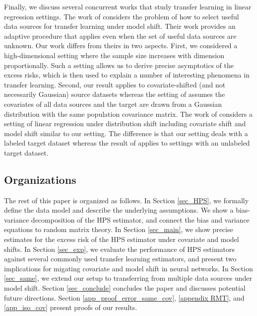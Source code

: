 Finally, we discuss several concurrent works that study transfer learning in linear regression settings.
The work of \citet{li2020transfer} considers the problem of how to select useful data sources for transfer learning under model shift.
Their work provides an adaptive procedure that applies even when the set of useful data sources are unknown.
Our work differs from theirs in two aspects.
First, we considered a high-dimensional setting where the sample size increases with dimension proportionally.
Such a setting allows us to derive precise asymptotics of the excess risks, which is then used to explain a number of interesting phenomena in transfer learning.
Second, our result applies to covariate-shifted (and not necessarily Gaussian) source datasets whereas the setting of \citet{li2020transfer} assumes the covariates of all data sources and the target are drawn from a Gaussian distribution with the same population covariance matrix.
The work of \citet{lei2021nearoptimal} considers a setting of linear regression under distribution shift including covariate shift and model shift similar to our setting.
The difference is that our setting deals with a labeled target dataset whereas the result of \citet{lei2021nearoptimal} applies to settings with an unlabeled target dataset.





\subsection{Organizations}
The rest of this paper is organized as follows.
In Section \ref{sec_HPS}, we formally define the data model and describe the underlying assumptions.
We show a bias-variance decomposition of the HPS estimator, and connect the bias and variance equations to random matrix theory.
In Section \ref{sec_main}, we show precise estimates for the excess risk of the HPS estimator under covariate and model shifts.
In Section \ref{sec_exp}, we evaluate the performance of HPS estimators against several commonly used transfer learning estimators, and present two implications for migating covariate and model shift in neural networks.
In Section \ref{sec_same}, we extend our setup to transferring from multiple data sources under model shift.
Section \ref{sec_conclude} concludes the paper and discusses potential future directions.
Section \ref{app_proof_error_same_cov}, \ref{appendix RMT}, and \ref{app_iso_cov} present proofs of our results.